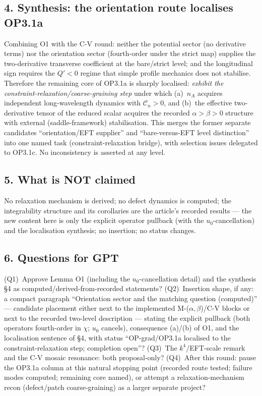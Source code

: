 \subsection*{4. Synthesis: the orientation route localises
OP3.1a}
Combining O1 with the C-V round: neither the potential sector
(no derivative terms) nor the orientation sector (fourth-order
under the strict map) supplies the two-derivative transverse
coefficient at the bare/strict level; and the longitudinal sign
requires the $Q'<0$ regime that simple profile mechanics does not
stabilise.
Therefore the remaining core of OP3.1a is sharply localised:
\emph{exhibit the constraint-relaxation/coarse-graining step}
under which (a)~$n_A$ acquires independent long-wavelength
dynamics with $\mathcal C_n>0$, and (b)~the effective
two-derivative tensor of the reduced scalar acquires the recorded
$\alpha>\beta>0$ structure with external (saddle-framework)
stabilisation.
This merges the former separate candidates ``orientation/EFT
supplier'' and ``bare-versus-EFT level distinction'' into one
named task (constraint-relaxation bridge), with selection issues
delegated to OP3.1c.
No inconsistency is asserted at any level.

\subsection*{5. What is NOT claimed}
No relaxation mechanism is derived; no defect dynamics is
computed; the integrability structure and its corollaries are the
article's recorded results --- the new content here is only the
explicit operator pullback (with the $u_0$-cancellation) and the
localisation synthesis; no insertion; no status changes.

\subsection*{6. Questions for GPT}
(Q1)~Approve Lemma O1 (including the $u_0$-cancellation detail)
and the synthesis \S4 as computed/derived-from-recorded
statements?
(Q2)~Insertion shape, if any: a compact paragraph ``Orientation
sector and the matching question (computed)'' --- candidate
placement either next to the implemented M-($\alpha,\beta$)/C-V
blocks or next to the recorded two-level description --- stating
the explicit pullback (both operators fourth-order in $\chi$;
$u_0$ cancels), consequence (a)/(b) of O1, and the localisation
sentence of \S4, with status ``OP-grad/OP3.1a localised to the
constraint-relaxation step; completion open''?
(Q3)~The $k^4$/EFT-scale remark and the C-V mosaic resonance:
both proposal-only?
(Q4)~After this round: pause the OP3.1a column at this natural
stopping point (recorded route tested; failure modes computed;
remaining core named), or attempt a relaxation-mechanism recon
(defect/patch coarse-graining) as a larger separate project?
